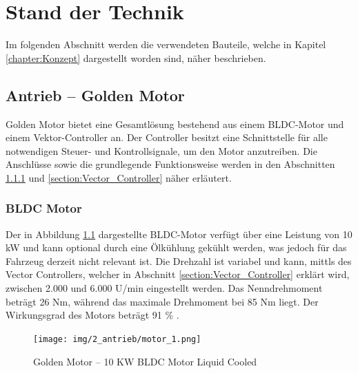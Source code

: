 \chapter{Stand der Technik}
\label{chapter:Stand_der_Technik}

Im folgenden Abschnitt werden die verwendeten Bauteile, welche in Kapitel \ref{chapter:Konzept} dargestellt worden sind, näher beschrieben.


\section{Antrieb – Golden Motor}
\label{section:Antrieb}

Golden Motor bietet eine Gesamtlösung bestehend aus einem BLDC-Motor und einem Vektor-Controller an. Der Controller besitzt eine Schnittstelle für alle notwendigen Steuer- und Kontrollsignale, um den Motor anzutreiben. Die Anschlüsse sowie die grundlegende Funktionsweise werden in den Abschnitten \ref{section:BLDC_Motor} und \ref{section:Vector_Controller} näher erläutert.

\subsection{BLDC Motor}
\label{section:BLDC_Motor}

Der in Abbildung \ref{BLDC_Motor:img:antrieb_motor} dargestellte BLDC-Motor verfügt über eine Leistung von 10 kW und kann optional durch eine Ölkühlung gekühlt werden, was jedoch für das Fahrzeug derzeit nicht relevant ist. Die Drehzahl ist variabel und kann, mittls des Vector Controllers, welcher in Abschnitt \ref{section:Vector_Controller} erklärt wird, zwischen 2.000 und 6.000 U/min eingestellt werden. Das Nenndrehmoment beträgt 26 Nm, während das maximale Drehmoment bei 85 Nm liegt. Der Wirkungsgrad des Motors beträgt 91 \% \cite{Golden_Motor:bldc_motor}.

\pagebreak[1]
\begin{figure}[!ht]
	\begin{center}
		\texttt{[image: img/2\_antrieb/motor\_1.png]}
		\caption{Golden Motor – 10 KW BLDC Motor Liquid Cooled}
		\label{BLDC_Motor:img:antrieb_motor}
	\end{center}
\end{figure}


